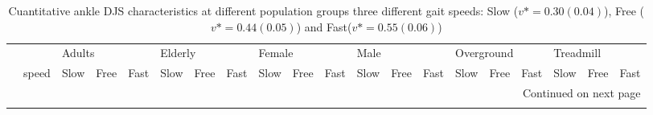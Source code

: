 \begin{longtable}{llrrrrrrrrrrrrrrrrrr}
\caption{Cuantitative ankle DJS characteristics at different population groups three different gait speeds: Slow ($v*=0.30(0.04)$), Free ($v*=0.44(0.05)$) and Fast($v*=0.55(0.06)$)}\label{tab:table2}\\
\toprule
    & {} & \multicolumn{3}{l}{Adults} & \multicolumn{3}{l}{Elderly} & \multicolumn{3}{l}{Female} & \multicolumn{3}{l}{Male} & \multicolumn{3}{l}{Overground} & \multicolumn{3}{l}{Treadmill} \\
    & speed &       Slow &       Free &       Fast &       Slow &       Free &       Fast &       Slow &       Free &       Fast &       Slow &       Free &       Fast &       Slow &       Free &       Fast &       Slow &       Free &       Fast \\
\midrule
\endhead
\midrule
\multicolumn{20}{r}{{Continued on next page}} \\
\midrule
\endfoot


\end{longtable}
